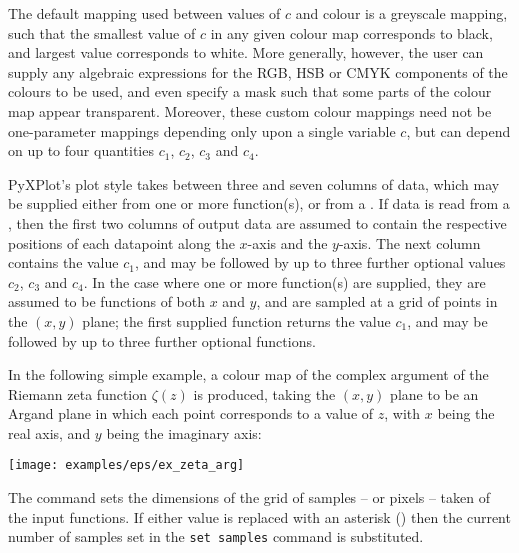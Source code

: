 The default mapping used between values of $c$ and colour is a greyscale
mapping, such that the smallest value of $c$ in any given colour map
corresponds to black, and largest value corresponds to white. More generally,
however, the user can supply any algebraic expressions for the RGB, HSB or CMYK
components of the colours to be used, and even specify a mask such that some
parts of the colour map appear transparent. Moreover, these custom colour
mappings need not be one-parameter mappings depending only upon a single
variable $c$, but can depend on up to four quantities $c_1$, $c_2$, $c_3$ and
$c_4$.

PyXPlot's  plot style takes between three and seven columns
of data, which may be supplied either from one or more function(s), or from a
\datafile. If data is read from a \datafile, then the first two columns of
output data are assumed to contain the respective positions of each datapoint
along the $x$-axis and the $y$-axis. The next column contains the value $c_1$,
and may be followed by up to three further optional values $c_2$, $c_3$ and
$c_4$. In the case where one or more function(s) are supplied, they are assumed
to be functions of both $x$ and $y$, and are sampled at a grid of points in the
$(x,y)$ plane; the first supplied function returns the value $c_1$, and may be
followed by up to three further optional functions.

In the following simple example, a colour map of the complex argument of the
Riemann zeta function $\zeta(z)$ is produced, taking the $(x,y)$ plane to be an
Argand plane in which each point corresponds to a value of $z$, with $x$ being
the real axis, and $y$ being the imaginary axis:

\newline
{}\newline
{}\newline
{}\newline
{}\newline
{}\newline
{}

\centerline{\texttt{[image: examples/eps/ex\_zeta\_arg]}}

The command  sets the dimensions of the grid of
samples -- or pixels -- taken of the input functions. If either value is
replaced with an asterisk ({\tt *}) then the current number of samples set in
the {\tt set samples} command is substituted.

